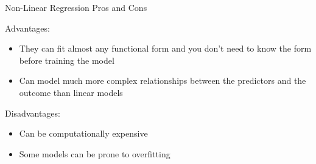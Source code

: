\documentclass[ignorenonframetext,]{beamer}
\providecommand{\tightlist}{%
  \setlength{\itemsep}{0pt}\setlength{\parskip}{0pt}}
\begin{document}
\begin{frame}{Non-Linear Regression Pros and Cons}

\begin{block}{Advantages:}

\begin{itemize}
\tightlist
\item
  They can fit almost any functional form and you don't need to know the
  form before training the model
\item
  Can model much more complex relationships between the predictors and
  the outcome than linear models
\end{itemize}

\end{block}

\begin{block}{Disadvantages:}

\begin{itemize}
\tightlist
\item
  Can be computationally expensive
\item
  Some models can be prone to overfitting
\end{itemize}

\end{block}

\end{frame}
\end{document}
